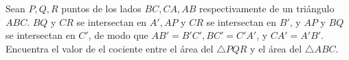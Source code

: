 Sean $P,Q,R$ puntos de los lados $BC,CA,AB$ respectivamente de un triángulo $ABC$. $BQ$ y $CR$ se intersectan en $A', AP$ y $CR$ se intersectan en $B'$, y $AP$ y $BQ$ se intersectan en $C'$, de modo que $AB' = B'C', BC' =C'A'$, y $CA'= A'B'$. Encuentra el valor de el cociente entre el área del $\triangle PQR$ y el área del $\triangle ABC$. 